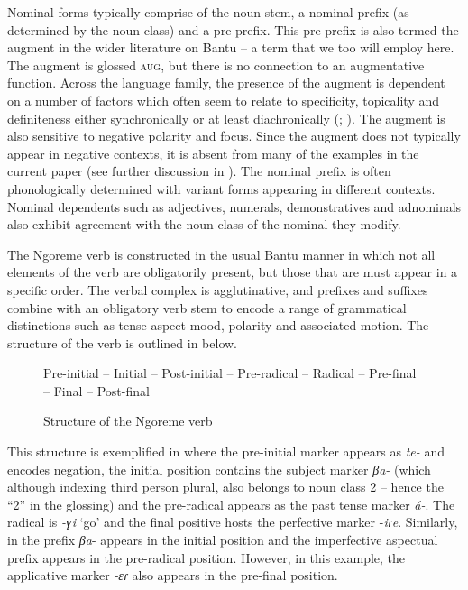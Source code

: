 \documentclass[output=paper,colorlinks,citecolor=brown,draftmode]{langscibook}
\begin{document}
Nominal forms typically comprise of the noun stem, a nominal prefix (as determined by the noun class) and a pre-prefix. This pre-prefix is also termed the augment in the wider literature on Bantu – a term that we too will employ here. The augment is glossed \textsc{aug}, but there is no connection to an augmentative function. Across the language family, the presence of the augment is dependent on a number of factors which often seem to relate to specificity, topicality and definiteness either synchronically or at least diachronically (\citealt{Blois1970}; \citealt{Velde2019}). The augment is also sensitive to negative polarity and focus. Since the augment does not typically appear in negative contexts, it is absent from many of the examples in the current paper (see further discussion in ). The nominal prefix is often phonologically determined with variant forms appearing in different contexts. Nominal dependents such as adjectives, numerals, demonstratives and adnominals also exhibit agreement with the noun class of the nominal they modify.

The Ngoreme verb is constructed in the usual Bantu manner in which not all elements of the verb are obligatorily present, but those that are must appear in a specific order. The verbal complex is agglutinative, and prefixes and suffixes combine with an obligatory verb stem to encode a range of grammatical distinctions such as tense-aspect-mood, polarity and associated motion. The structure of the verb is outlined in  below.


\begin{figure}
\small Pre-initial – Initial – Post-initial – Pre-radical – Radical – Pre-final – Final – Post-final
\caption{Structure of the Ngoreme verb}
\label{fig:ngo:1}
\end{figure}

This structure is exemplified in  where the pre-initial marker appears as \textit{te-} and encodes negation, the initial position contains the subject marker \textit{βa{}-} (which although indexing third person plural, also belongs to noun class 2 -- hence the “2” in the glossing) and the pre-radical appears as the past tense marker \textit{á-}. The radical is \textit{-ɣi} ‘go’ and the final positive hosts the perfective marker -\textit{iɾe}. Similarly, in  the prefix \textit{βa}{}- appears in the initial position and the imperfective aspectual prefix appears in the pre-radical position. However, in this example, the applicative marker \textit{{}-ɛɾ} also appears in the pre-final position. 
\end{document}

